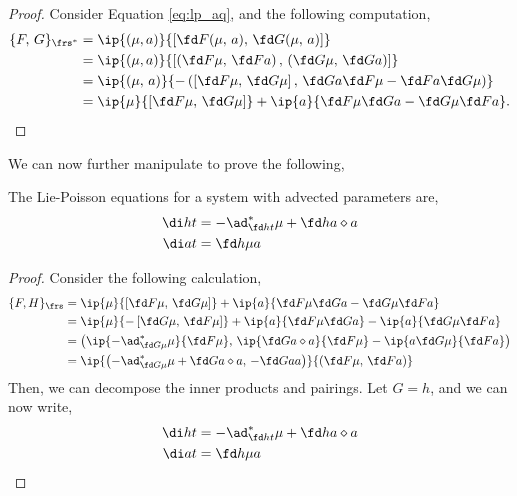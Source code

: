 \begin{proof}
  Consider Equation \ref{eq:lp_aq}, and the following computation,
  \begin{align*}
    \{F,\, G\}_{\frs^*} &= \ip{(\mu, a)}{\left[ \fd F {(\mu,\, a)},\, \fd G {(\mu,\, a)} \right]} \\
    &= \ip{(\mu, a)}{\left[ \left( \fd F \mu,\, \fd F a \right),\, \left( \fd G \mu,\, \fd G a \right) \right]} \\
    &= \ip{(\mu,\, a)}{-\left( \left[\fd F \mu,\, \fd G \mu\right],\,\fd G a\fd F \mu - \fd F a\fd G \mu \right)} \\
    &= \ip{\mu}{\left[ \fd F \mu,\, \fd G \mu \right]} + \ip{a}{\fd F \mu\fd G a - \fd G \mu\fd F a}.
  \end{align*}
\end{proof}

\noindent
We can now further manipulate to prove the following,
\begin{nthm}
  The Lie-Poisson equations for a system with advected parameters are,
  \begin{equation}
    \begin{split}
      \di h t &= -\ad^*_{\fd h t} \mu + \fd h a \diamond a \\
      \di a t &= \fd h \mu a
    \end{split}
  \end{equation}
\end{nthm}
\begin{proof}
  Consider the following calculation,
  \begin{align*}
        \{F, H\}_\frs &= \ip{\mu}{\left[ \fd F \mu,\, \fd G \mu \right]} + \ip{a}{\fd F \mu\fd G a - \fd G \mu\fd F a}\\
        &= \ip{\mu}{-\left[ \fd G \mu,\, \fd F \mu \right]} + \ip{a}{\fd F \mu\fd G a} - \ip{a}{\fd G \mu\fd F a}\\
        &= \left( \ip{-\ad^*_{\fd G \mu} \mu}{\fd F \mu},\, \ip{\fd G a \diamond a}{\fd F \mu} - \ip{a\fd G \mu}{\fd F a} \right)\\
        &= \ip{\left( - \ad^*_{\fd G \mu}\mu + \fd G a \diamond a,\, -\fd G a a \right)}{\left( \fd F\mu,\, \fd F a \right)}
  \end{align*}
  Then, we can decompose the inner products and pairings. Let $G  =h$, and we can now write,
  \begin{equation}
    \begin{split}
      \di h t &= -\ad^*_{\fd h t} \mu + \fd h a \diamond a \\
      \di a t &= \fd h \mu a
    \end{split}
  \end{equation}
\end{proof}